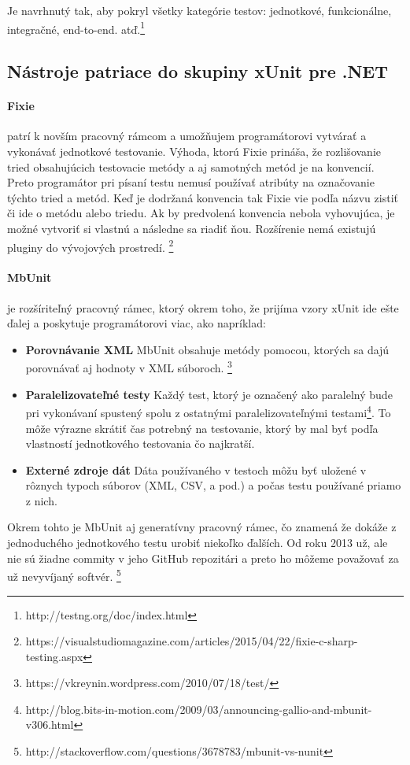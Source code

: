 \documentclass[11pt,twoside,slovak,a4paper]{article}
\begin{document}
	Je navrhnutý tak, aby pokryl všetky kategórie testov: jednotkové, funkcionálne, integračné, end-to-end. atď.\footnote{http://testng.org/doc/index.html}

		\subsection{Nástroje patriace do skupiny xUnit pre .NET}
			
			\paragraph{Fixie} patrí k novším pracovný rámcom a umožňujem programátorovi vytvárať a vykonávať jednotkové testovanie. Výhoda, ktorú Fixie prináša, že rozlišovanie tried obsahujúcich testovacie metódy a aj samotných metód je na konvencií. Preto programátor pri písaní testu nemusí používať atribúty na označovanie týchto tried a metód. Keď je dodržaná konvencia tak Fixie vie podľa názvu zistiť či ide o metódu alebo triedu. Ak by predvolená konvencia nebola vyhovujúca, je možné vytvoriť si vlastnú a následne sa riadiť ňou. Rozšírenie nemá existujú pluginy do vývojových prostredí.  \footnote{https://visualstudiomagazine.com/articles/2015/04/22/fixie-c-sharp-testing.aspx}
			
			\paragraph{MbUnit} je rozšíriteľný pracovný rámec, ktorý okrem toho, že prijíma vzory xUnit ide ešte ďalej a poskytuje programátorovi viac, ako napríklad:
			\begin{itemize}
				\item \textbf{Porovnávanie XML} MbUnit obsahuje metódy pomocou, ktorých sa dajú porovnávať aj hodnoty v XML súboroch. \footnote{https://vkreynin.wordpress.com/2010/07/18/test/}
				\item \textbf{Paralelizovateľné testy} Každý test, ktorý je označený ako paralelný bude pri vykonávaní spustený spolu z ostatnými paralelizovateľnými testami\footnote{http://blog.bits-in-motion.com/2009/03/announcing-gallio-and-mbunit-v306.html}. To môže výrazne skrátiť čas potrebný na testovanie, ktorý by mal byť podľa vlastností jednotkového testovania čo najkratší. 
				\item \textbf{Externé zdroje dát} Dáta používaného v testoch môžu byť uložené v rôznych typoch súborov (XML, CSV, a pod.) a počas testu používané priamo z nich.
			\end{itemize}
			Okrem tohto je MbUnit aj generatívny pracovný rámec, čo znamená že dokáže z jednoduchého jednotkového testu urobiť niekoľko ďalších. Od roku 2013 už, ale nie sú žiadne commity v jeho GitHub repozitári a preto ho môžeme považovať za už nevyvíjaný softvér. \footnote{http://stackoverflow.com/questions/3678783/mbunit-vs-nunit}
			
\end{document}
